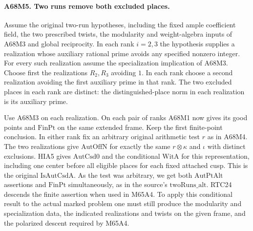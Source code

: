 \paragraph{A68M5. Two runs remove both excluded places.}
Assume the original two-run hypotheses, including the fixed ample
coefficient field, the two prescribed twists, the modularity and
weight-algebra inputs of A68M3 and global reciprocity. In each rank
$i=2,3$ the hypothesis supplies a realization whose auxiliary
rational prime avoids any specified nonzero integer. For every such
realization assume the specialization implication of A68M3. Choose
first the realizations $R_2,R_3$ avoiding $1$. In each rank choose
a second realization avoiding the first auxiliary prime in that
rank. The two excluded places in each rank are distinct: the
distinguished-place norm in each realization is its auxiliary prime.

Use A68M3 on each realization. On each pair of ranks A68M1 now
gives its good points and $\mathrm{FinPt}$ on the same extended
frame. Keep the first finite-point conclusion. In either rank fix
an arbitrary original arithmetic test $r$ as in A68M4. The two
realizations give $\mathrm{AutOffN}$ for exactly the same
$r\otimes\kappa$ and $\iota$ with distinct exclusions.
HIA5 gives $\mathrm{AutCsd0}$ and the conditional
$\mathrm{WitA}$ for this representation, including one center
before all eligible places for each fixed attached cusp.
This is the original $\mathrm{IsAutCsdA}$. As the test was
arbitrary, we get both $\mathrm{AutPtAlt}$ assertions and
$\mathrm{FinPt}$ simultaneously, as in the source's
$\mathrm{twoRuns\_alt}$. RTC24 descends the finite assertion
when used in M65A4. To apply this conditional result to the
actual marked problem one must still produce the modularity and
specialization data, the indicated realizations and twists on the
given frame, and the polarized descent required by M65A4.
